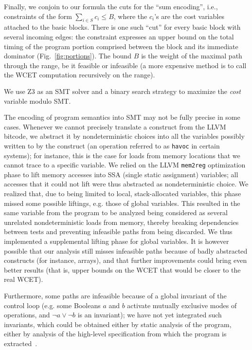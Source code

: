\documentclass[a4paper,twocolumn,11pt]{article}
\begin{document}
Finally, we conjoin to our formula the cuts for the ``sum
encoding'', i.e., constraints of the form $\sum_{i\in S} c_i \leq B$, where the
$c_i$'s are the cost variables attached to the basic blocks.
There is one such ``cut'' for every basic block with several incoming edges:
the constraint expresses an upper bound on the total timing of the program portion comprised between the block and its immediate dominator (Fig.~\ref{fig:portions}).
The bound $B$ is the weight of the maximal path through the range, be it feasible or infeasible (a more expensive method is to call the WCET computation recursively on the range).

We use Z3 \parencite{DBLP:conf/tacas/MouraB08} as an SMT solver and a binary search strategy to maximize the \emph{cost} variable modulo SMT.

The encoding of program semantics into SMT may not be fully precise in some cases.
Whenever we cannot precisely translate a construct from the LLVM bitcode, we abstract it by nondeterministic choices into all the variables possibly written to by the construct (an operation referred to as \texttt{havoc} in certain systems); for instance, this is the case for loads from memory locations that we cannot trace to a specific variable. We relied on the LLVM \verb+mem2reg+ optimization phase to lift memory accesses into SSA (single static assignment) variables; all accesses that it could not lift were thus abstracted as nondeterministic choice. We realized that, due to being limited to local, stack-allocated variables, this phase missed some possible liftings, e.g. those of global variables. This resulted in the same variable from the program to be analyzed being considered as several unrelated nondeterministic loads from memory, thereby breaking dependencies between tests and preventing infeasible paths from being discarded. We thus implemented a supplemental lifting phase for global variables.
It is however possible that our analysis still misses infeasible paths because of badly abstracted constructs (for instance, arrays), and that further improvements could bring even better results (that is, upper bounds on the WCET that would be closer to the real WCET).

Furthermore, some paths are infeasible because of a global invariant of the control loop (e.g. some Booleans $a$ and $b$ activate mutually exclusive modes of operations, and $\neg a \lor \neg b$ is an invariant); we have not yet integrated such invariants, which could be obtained either by static analysis of the program, either by analysis of the high-level specification from which the program is extracted~\parencite{Asavoae_et_al-WCET2013}.
\end{document}

